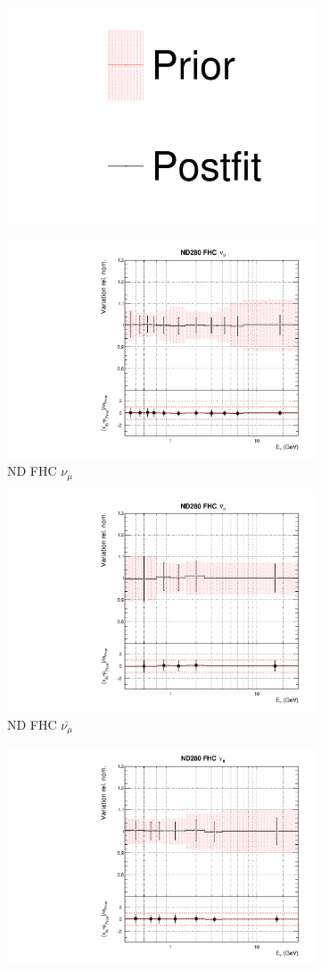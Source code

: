 \begin{figure}
\centering
\begin{subfigure}{0.8\textwidth}
  \centering
  \includegraphics[width=0.24\linewidth]{figs/asmv_leg}
\end{subfigure}
\begin{subfigure}{0.45\textwidth}
  \centering
  \includegraphics[width=0.75\linewidth]{figs/asmvflux0}
  \caption{ND FHC $\nu_{\mu}$}
\end{subfigure}
\begin{subfigure}{0.45\textwidth}
  \centering
  \includegraphics[width=0.75\linewidth]{figs/asmvflux1}
  \caption{ND FHC $\bar{\nu_{\mu}}$}
\end{subfigure}
\begin{subfigure}{0.45\textwidth}
  \centering
  \includegraphics[width=0.75\linewidth]{figs/asmvflux2}

\end{subfigure}
\end{figure}

